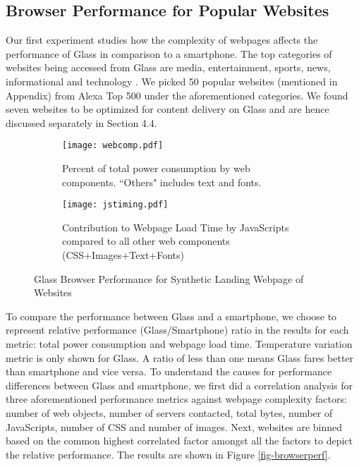 \documentclass{sig-alternate-10pt}
\newlength\figwidth
\begin{document}
\subsection{Browser Performance for Popular Websites}

Our first experiment studies how the complexity of webpages affects the  performance of  Glass in comparison to a smartphone. The top categories of websites being accessed from Glass are media, entertainment, sports, news, informational and technology \cite{misc14}. We picked 50 popular websites (mentioned in  Appendix) from Alexa   Top 500 under the aforementioned  categories.  We found  seven websites  to be  optimized for content delivery on Glass and are hence discussed separately in Section 4.4.




\begin{figure*}[ht]
  \centering
  \begin{subfigure}{0.8\figwidth}

    \texttt{[image: webcomp.pdf]}
\caption{Percent of total power consumption by web components. ``Others"  includes text and fonts.}
\label{fig-webcomp}
\end{subfigure}
\begin{subfigure}{0.8\figwidth}
\texttt{[image: jstiming.pdf]}
\caption{Contribution to Webpage Load   Time by  JavaScripts compared to all other web components (CSS+Images+Text+Fonts)  }
\label{fig-jstiming}
\end{subfigure}
\caption{Glass Browser Performance for Synthetic Landing Webpage of Websites}
    \label{fig-syn}


\end{figure*}

To compare  the performance  between  Glass and a smartphone, we choose to represent relative performance (Glass/Smartphone) ratio  in the results for each metric: total power consumption and webpage load time. Temperature variation metric is only shown for Glass. A ratio of less than one means Glass fares better than smartphone and vice versa.  To  understand the causes for performance differences between Glass and smartphone, we first did a correlation analysis for three aforementioned performance metrics  against  webpage complexity factors: number of web objects, number of servers contacted, total bytes, number of JavaScripts, number of CSS and number of images.  Next, websites are binned based on the common highest correlated factor amongst all the factors to depict the relative performance. The results are shown in Figure \ref{fig-browserperf}. 
\end{document}
